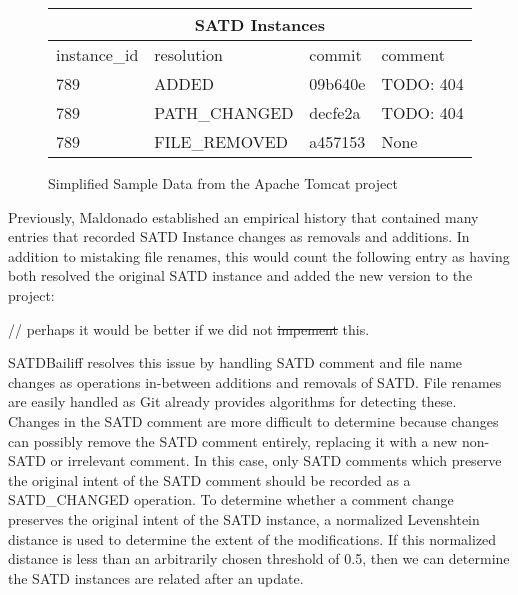 \documentclass[conference]{IEEEtran}
\begin{document}
\begin{figure}
    \centering
    \begin{tabular}{ |p{4.4em}|p{7.6em}|p{3.5em}|p{4.8em}|   }
     \hline
     \multicolumn{4}{|c|}{SATD Instances} \\
     \hline
     instance\_id & resolution & commit & comment\\
     \hline
     789 & ADDED         & 09b640e & TODO: 404\\
     789 & PATH\_CHANGED & decfe2a & TODO: 404\\ 
     789 & FILE\_REMOVED & a457153 & None\\
    
     \hline
    \end{tabular}
    \caption{Simplified Sample Data from the Apache Tomcat project}
    \label{fig:sample_data}
\end{figure}

Previously, Maldonado established an empirical history that contained many entries that recorded SATD Instance changes as removals and additions. In addition to mistaking file renames, this would count the following entry as having both resolved the original SATD instance and added the new version to the project:

\vspace{1em}

// perhaps it would be better if we did not \sout{impement}  this.

\vspace{1em}

SATDBailiff resolves this issue by handling SATD comment and file name changes as operations in-between additions and removals of SATD. File renames are easily handled as Git already provides algorithms for detecting these. Changes in the SATD comment are more difficult to determine because changes can possibly remove the SATD comment entirely, replacing it with a new non-SATD or irrelevant comment. In this case, only SATD comments which preserve the original intent of the SATD comment should be recorded as a SATD\_CHANGED operation. To determine whether a comment change preserves the original intent of the SATD instance, a normalized Levenshtein distance \cite{Yujian} is used to determine the extent of the modifications. If this normalized distance is less than an arbitrarily chosen threshold of 0.5, then we can determine the SATD instances are related after an update.
\end{document}
